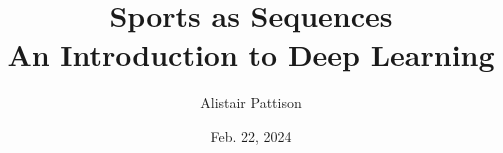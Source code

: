 \documentclass{beamer}
\title{{Sports as Sequences} \\ \small An Introduction to Deep Learning}
\author{Alistair Pattison}
\date{Feb. 22, 2024}
\begin{document}
\begin{frame}
	\titlepage
\end{frame}




\end{document}
